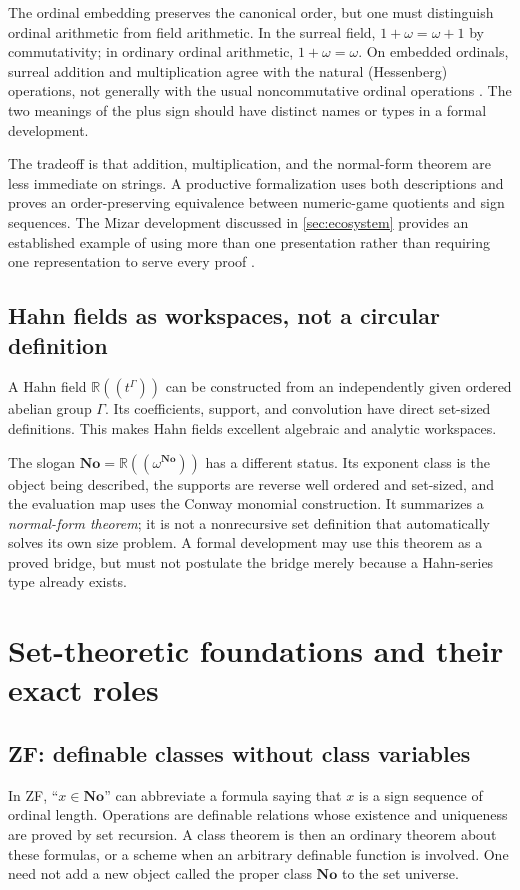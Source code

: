 \documentclass[11pt,letterpaper]{article}
\numberwithin{equation}{section}
\theoremstyle{definition}
\theoremstyle{remark}
\newcommand{\No}{\mathbf{No}}
\newcommand{\R}{\mathbb R}
\begin{document}
The ordinal embedding preserves the canonical order, but one must distinguish ordinal arithmetic from field arithmetic. In the surreal field, $1+\omega=\omega+1$ by commutativity; in ordinary ordinal arithmetic, $1+\omega=\omega$. On embedded ordinals, surreal addition and multiplication agree with the natural (Hessenberg) operations, not generally with the usual noncommutative ordinal operations \cite{Conway}. The two meanings of the plus sign should have distinct names or types in a formal development.

The tradeoff is that addition, multiplication, and the normal-form theorem are less immediate on strings. A productive formalization uses both descriptions and proves an order-preserving equivalence between numeric-game quotients and sign sequences. The Mizar development discussed in \cref{sec:ecosystem} provides an established example of using more than one presentation rather than requiring one representation to serve every proof \cite{PakKaliszyk}.

\subsection{Hahn fields as workspaces, not a circular definition}
A Hahn field $\R((t^\Gamma))$ can be constructed from an independently given ordered abelian group $\Gamma$. Its coefficients, support, and convolution have direct set-sized definitions. This makes Hahn fields excellent algebraic and analytic workspaces.

The slogan $\No=\R((\omega^{\No}))$ has a different status. Its exponent class is the object being described, the supports are reverse well ordered and set-sized, and the evaluation map uses the Conway monomial construction. It summarizes a \emph{normal-form theorem}; it is not a nonrecursive set definition that automatically solves its own size problem. A formal development may use this theorem as a proved bridge, but must not postulate the bridge merely because a Hahn-series type already exists.

\section{Set-theoretic foundations and their exact roles}\label{sec:settheories}

\subsection{ZF: definable classes without class variables}
In ZF, ``$x\in\No$'' can abbreviate a formula saying that $x$ is a sign sequence of ordinal length. Operations are definable relations whose existence and uniqueness are proved by set recursion. A class theorem is then an ordinary theorem about these formulas, or a scheme when an arbitrary definable function is involved. One need not add a new object called the proper class $\No$ to the set universe.
\end{document}
